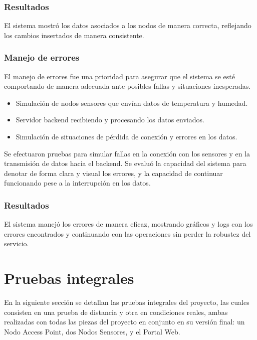 \subsubsection{Resultados}
El sistema mostró los datos asociados a los nodos de manera correcta, reflejando los cambios insertados de manera consistente. 

\subsubsection{Manejo de errores}

El manejo de errores fue una prioridad para asegurar que el sistema se esté comportando de manera adecuada ante posibles fallas y situaciones inesperadas. 

\begin{itemize}
    \item Simulación de nodos sensores que envían datos de temperatura y humedad.
    \item Servidor backend recibiendo y procesando los datos enviados.
    \item Simulación de situaciones de pérdida de conexión y errores en los datos. 
\end{itemize}

Se efectuaron pruebas para simular fallas en la conexión con los sensores y en la transmisión de datos hacia el backend. Se evaluó la capacidad del sistema para denotar de forma clara y visual los errores, y la capacidad de continuar funcionando pese a la interrupción en los datos. 

\subsubsection{Resultados}
El sistema manejó los errores de manera eficaz, mostrando gráficos y logs con los errores encontrados y continuando con las operaciones sin perder la robustez del servicio. 


\section{Pruebas integrales}
\label{sec:pruebasInt}
En la siguiente sección se detallan las pruebas integrales del proyecto, las cuales consisten en una prueba de distancia y otra en condiciones reales, ambas realizadas con todas las piezas del proyecto en conjunto en su versión final: un Nodo Access Point, dos Nodos Sensores, y el Portal Web.

